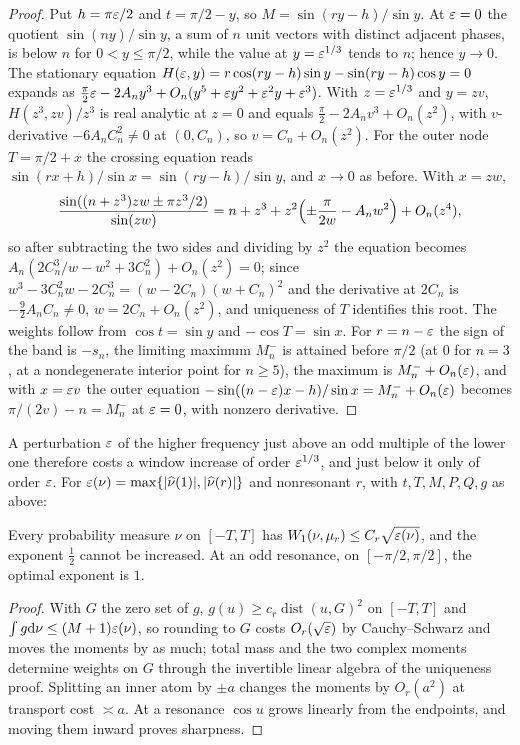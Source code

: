 \begin{proof}
Put $h=\pi\varepsilon/2$ and $t=\pi/2-y$, so $M=\sin(ry-h)/\sin y$. At $\varepsilon=0$ the quotient $\sin(ny)/\sin y$, a sum of
$n$ unit vectors with distinct adjacent phases, is below $n$ for $0<y\le\pi/2$, while the value at
$y=\varepsilon^{1/3}$ tends to $n$; hence $y\to0$. The stationary equation
$H(\varepsilon,y)=r\cos(ry-h)\sin y-\sin(ry-h)\cos y=0$ expands as
$\tfrac\pi2\varepsilon-2A_ny^3+O_n(y^5+\varepsilon y^2+\varepsilon^2y+\varepsilon^3)$. With $z=\varepsilon^{1/3}$ and $y=zv$, $H(z^3,zv)/z^3$ is
real analytic at $z=0$ and equals $\tfrac\pi2-2A_nv^3+O_n(z^2)$, with $v$-derivative $-6A_nC_n^2\ne0$ at
$(0,C_n)$, so $v=C_n+O_n(z^2)$. For the outer node $T=\pi/2+x$ the crossing equation reads
$\sin(rx+h)/\sin x=\sin(ry-h)/\sin y$, and $x\to0$ as before. With $x=zw$,
\[
 \frac{\sin((n+z^3)zw\pm\pi z^3/2)}{\sin(zw)}=n+z^3+z^2\Bigl(\pm\frac\pi{2w}-A_nw^2\Bigr)+O_n(z^4),
\]
so after subtracting the two sides and dividing by $z^2$ the equation becomes
$A_n(2C_n^3/w-w^2+3C_n^2)+O_n(z^2)=0$; since $w^3-3C_n^2w-2C_n^3=(w-2C_n)(w+C_n)^2$ and the derivative at
$2C_n$ is $-\tfrac92A_nC_n\ne0$, $w=2C_n+O_n(z^2)$, and uniqueness of $T$ identifies this root. The weights
follow from $\cos t=\sin y$ and $-\cos T=\sin x$. For $r=n-\varepsilon$ the sign of the band is $-s_n$, the limiting
maximum $M_n^-$ is attained before $\pi/2$ (at $0$ for $n=3$, at a nondegenerate interior point for $n\ge5$),
the maximum is $M_n^-+O_n(\varepsilon)$, and with $x=\varepsilon v$ the outer equation
$-\sin((n-\varepsilon)x-h)/\sin x=M_n^-+O_n(\varepsilon)$ becomes $\pi/(2v)-n=M_n^-$ at $\varepsilon=0$, with nonzero derivative.
\end{proof}

A perturbation $\varepsilon$ of the higher frequency just above an odd multiple of the lower one therefore
costs a window increase of order $\varepsilon^{1/3}$, and just below it only of order $\varepsilon$. For
$\varepsilon(\nu)=\max\{\lvert\widehat\nu(1)\rvert,\lvert\widehat\nu(r)\rvert\}$ and nonresonant $r$, with $t,T,M,P,Q,g$ as above:

\begin{proposition}\label{rec:prop:twostable}
Every probability measure $\nu$ on $[-T,T]$ has $W_1(\nu,\mu_r)\le C_r\sqrt{\varepsilon(\nu)}$, and the exponent $\tfrac12$
cannot be increased. At an odd resonance, on $[-\pi/2,\pi/2]$, the optimal exponent is $1$.
\end{proposition}

\begin{proof}
With $G$ the zero set of $g$, $g(u)\ge c_r\operatorname{dist}(u,G)^2$ on $[-T,T]$ and $\int g\mathrm{d}\nu\le(M+1)\varepsilon(\nu)$, so
rounding to $G$ costs $O_r(\sqrt{\varepsilon})$ by Cauchy--Schwarz and moves the moments by as much; total mass and
the two complex moments determine weights on $G$ through the invertible linear algebra of the
uniqueness proof. Splitting an inner atom by $\pm a$ changes the moments by $O_r(a^2)$ at transport
cost $\asymp a$. At a resonance $\cos u$ grows linearly from the endpoints, and moving them inward proves
sharpness.
\end{proof}

